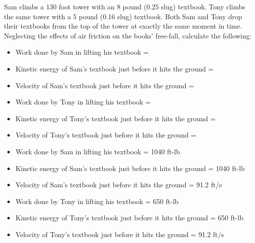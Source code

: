 

Sam climbs a 130 foot tower with an 8 pound (0.25 slug) textbook.  Tony climbs the same tower with a 5 pound (0.16 slug) textbook.  Both Sam and Tony drop their textbooks from the top of the tower at exactly the same moment in time.  Neglecting the effects of air friction on the books' free-fall, calculate the following:

\begin{itemize}
\item{} Work done by Sam in lifting his textbook = 
\item{} Kinetic energy of Sam's textbook just before it hits the ground =
\item{} Velocity of Sam's textbook just before it hits the ground =
\end{itemize}

\begin{itemize}
\item{} Work done by Tony in lifting his textbook = 
\item{} Kinetic energy of Tony's textbook just before it hits the ground =
\item{} Velocity of Tony's textbook just before it hits the ground =
\end{itemize}







\begin{itemize}
\item{} Work done by Sam in lifting his textbook = 1040 ft-lb
\item{} Kinetic energy of Sam's textbook just before it hits the ground = 1040 ft-lb
\item{} Velocity of Sam's textbook just before it hits the ground = 91.2 ft/s
\end{itemize}

\begin{itemize}
\item{} Work done by Tony in lifting his textbook = 650 ft-lb
\item{} Kinetic energy of Tony's textbook just before it hits the ground = 650 ft-lb
\item{} Velocity of Tony's textbook just before it hits the ground = 91.2 ft/s
\end{itemize}

